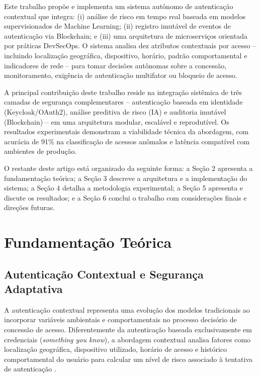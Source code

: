 \documentclass[12pt,a4paper]{article}
\begin{document}
Este trabalho propõe e implementa um sistema autônomo de autenticação contextual que integra: (i) análise de risco em tempo real baseada em modelos supervisionados de Machine Learning; (ii) registro imutável de eventos de autenticação via Blockchain; e (iii) uma arquitetura de microserviços orientada por práticas DevSecOps. O sistema analisa dez atributos contextuais por acesso -- incluindo localização geográfica, dispositivo, horário, padrão comportamental e indicadores de rede -- para tomar decisões autônomas sobre a concessão, monitoramento, exigência de autenticação multifator ou bloqueio de acesso.

A principal contribuição deste trabalho reside na integração sistêmica de três camadas de segurança complementares -- autenticação baseada em identidade (Keycloak/OAuth2), análise preditiva de risco (IA) e auditoria imutável (Blockchain) -- em uma arquitetura modular, escalável e reprodutível. Os resultados experimentais demonstram a viabilidade técnica da abordagem, com acurácia de 91\% na classificação de acessos anômalos e latência compatível com ambientes de produção.

O restante deste artigo está organizado da seguinte forma: a Seção 2 apresenta a fundamentação teórica; a Seção 3 descreve a arquitetura e a implementação do sistema; a Seção 4 detalha a metodologia experimental; a Seção 5 apresenta e discute os resultados; e a Seção 6 conclui o trabalho com considerações finais e direções futuras.

\section{Fundamentação Teórica}

\subsection{Autenticação Contextual e Segurança Adaptativa}

A autenticação contextual representa uma evolução dos modelos tradicionais ao incorporar variáveis ambientais e comportamentais no processo decisório de concessão de acesso. Diferentemente da autenticação baseada exclusivamente em credenciais (\textit{something you know}), a abordagem contextual analisa fatores como localização geográfica, dispositivo utilizado, horário de acesso e histórico comportamental do usuário para calcular um nível de risco associado à tentativa de autenticação \cite{nist2020}.
\end{document}
